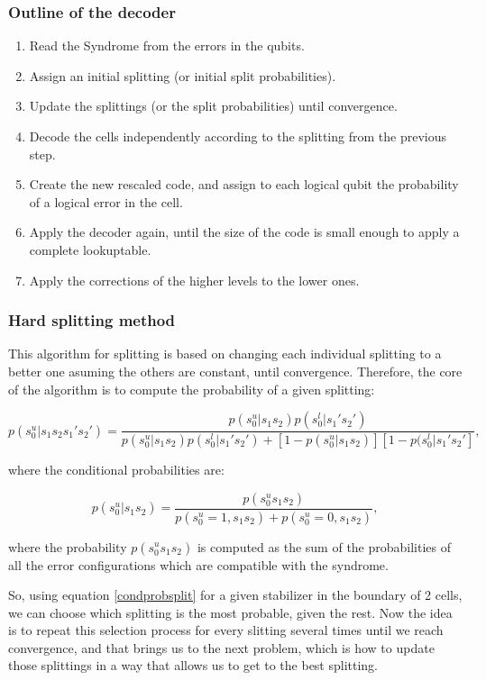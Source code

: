 \documentclass[a4paper,12pt]{article}
\begin{document}
\subsubsection{Outline of the decoder}

\begin{enumerate}
\item Read the Syndrome from the errors in the qubits.
\item Assign an initial splitting (or initial split probabilities).
\item Update the splittings (or the split probabilities) until convergence.
\item Decode the cells independently according to the splitting from the previous step.
\item Create the new rescaled code, and assign to each logical qubit the probability of a logical error in the cell.
\item Apply the decoder again, until the size of the code is small enough to apply a complete lookuptable.
\item Apply the corrections of the higher levels to the lower ones.


\end{enumerate}

\subsubsection{Hard splitting method}
This algorithm for splitting is based on changing each individual splitting to a better one asuming the others are constant, until convergence. Therefore, the core of the algorithm is to compute the probability of a given splitting:

\begin{equation}
p(s_0^u|s_1s_2s_1's_2')=\frac{p(s_0^u|s_1s_2)p(s_0^l|s_1's_2')}{p(s_0^u|s_1s_2)p(s_0^l|s_1's_2')+[1-p(s_0^u|s_1s_2)][1-p(s_0^l|s_1's_2']},
\label{condprobsplit}
\end{equation}

where the conditional probabilities are:

\begin{equation}
p(s_0^u|s_1s_2)=\frac{p(s_0^us_1s_2)}{p(s_0^u=1,s_1s_2)+p(s_0^u=0,s_1s_2)},
\end{equation}

where the probability $p(s_0^us_1s_2)$ is computed as the sum of the probabilities of all the error configurations which are compatible with the syndrome.

So, using equation \ref{condprobsplit} for a given stabilizer in the boundary of 2 cells, we can choose which splitting is the most probable, given the rest. Now the idea is to repeat this selection process for every slitting several times until we reach convergence, and that brings us to the next problem, which is how to update those splittings in a way that allows us to get to the best splitting.
\end{document}
